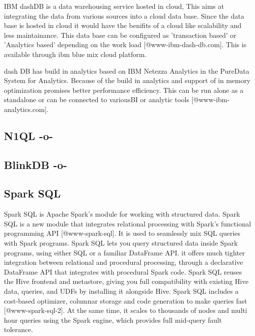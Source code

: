 IBM dashDB is a data warehousing service hosted in cloud, This aims
at integrating the data from various sources into a cloud data
base. Since the data base is hosted in cloud it would have the
benifits of a cloud like scalability and less maintainance. This data
base can be configured as 'transaction based' or 'Analytics based'
depending on the work load [@www-ibm-dash-db.com]. This is
available through ibm blue mix cloud platform.

dash DB has build in analytics based on IBM Netezza Analytics in the
PureData System for Analytics. Because of the build in analytics and
support of in memory optimization promises better performance
efficiency.  This can be run alone as a standalone or can be connected
to variousBI or analytic tools [@www-ibm-analytics.com].


       
\subsection{N1QL -o-}



\subsection{BlinkDB -o-}



\subsection{Spark SQL}

Spark SQL is Apache Spark's module for working with structured
data. Spark SQL is a new module that integrates relational processing
with Spark's functional programming API [@www-spark-sql]. It is
used to seamlessly mix SQL queries with Spark programs. Spark SQL lets
you query structured data inside Spark programs, using either SQL or a
familiar DataFrame API.  it offers much tighter integration between
relational and procedural processing, through a declarative DataFrame
API that integrates with procedural Spark code.  Spark SQL reuses the
Hive frontend and metastore, giving you full compatibility with
existing Hive data, queries, and UDFs by installing it alongside
Hive. Spark SQL includes a cost-based optimizer, columnar storage and
code generation to make queries fast [@www-spark-sql-2]. At the
same time, it scales to thousands of nodes and multi hour queries
using the Spark engine, which provides full mid-query fault tolerance.

